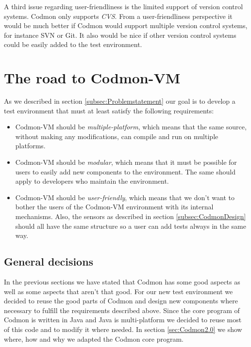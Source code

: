 \documentclass{article}
\newcommand{\project}{Codmon-VM}
\begin{document}
\noindent A third issue regarding user-friendliness is the limited support of version control systems. Codmon only supports \emph{CVS}\cite{CVS}. From a user-friendliness perspective it would be much better 
if Codmon would support multiple version control systems, for instance SVN\cite{SVN} or Git\cite{Git}. It also would be nice if other version control systems could be easily added to the test environment.


\section{The road to \project{}}
\label{sec:road}
As we described in section \ref{subsec:Problemstatement} our goal is to develop a test environment that must at least satisfy the following requirements:

\begin{itemize}
\item \project{} should be \emph{multiple-platform}, which means that the same source, without making any modifications, can compile and run on multiple platforms.
\item \project{} should be \emph{modular}, which means that it must be possible for users to easily add new components to the environment. The same should apply to developers who maintain the environment.
\item \project{} should be \emph{user-friendly}, which means that we don't want to bother the users of the \project{} environment with its internal mechanisms. Also, the sensors as described in 
section \ref{subsec:CodmonDesign} should all have the same structure so a user can add tests always in the same way.
\end{itemize}

\subsection{General decisions}
\label{subsec:general}
In the previous sections we have stated that Codmon has some good aspects as well as some aspects that aren't that good. For our new test environment we decided to reuse the good parts of Codmon and design 
new components where necessary to fulfill the requirements described above. Since the core program of Codmon is written in Java and Java is multi-platform we decided to reuse most of this code and to 
modify it where needed. In section \ref{sec:Codmon2.0} we show where, how and why we adapted the Codmon core program. 
\end{document}
